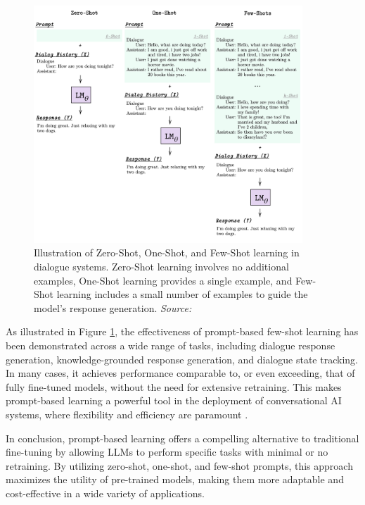 \begin{figure}[h]
    \centering
    \includegraphics[width=0.9\textwidth]{images/llms/zero-one-few-shots.png}
    \caption{Illustration of Zero-Shot, One-Shot, and Few-Shot learning in dialogue systems. Zero-Shot learning involves no additional examples, One-Shot learning provides a single example, and Few-Shot learning includes a small number of examples to guide the model's response generation. \textit{Source:} \cite{madotto2021few}}
    \label{fig:zero_one_few_shot}
\end{figure}

As illustrated in Figure \ref{fig:zero_one_few_shot}, the effectiveness of prompt-based few-shot learning has been demonstrated across a wide range of tasks, including dialogue response generation, knowledge-grounded response generation, and dialogue state tracking. In many cases, it achieves performance comparable to, or even exceeding, that of fully fine-tuned models, without the need for extensive retraining. This makes prompt-based learning a powerful tool in the deployment of conversational AI systems, where flexibility and efficiency are paramount \cite{madotto2021few}.

In conclusion, prompt-based learning offers a compelling alternative to traditional fine-tuning by allowing LLMs to perform specific tasks with minimal or no retraining. By utilizing zero-shot, one-shot, and few-shot prompts, this approach maximizes the utility of pre-trained models, making them more adaptable and cost-effective in a wide variety of applications.

